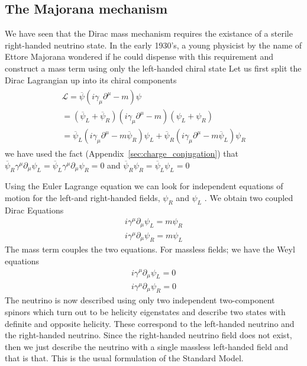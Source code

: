 \subsection{\label{sub:sm_mass_models}The Majorana mechanism}
We have seen that the Dirac mass mechanism requires the existance of a sterile right-handed neutrino state. In the early 1930’s, a young physicist by the name of Ettore Majorana wondered if he could dispense with this requirement and construct a mass term using only the left-handed chiral state
Let us first split the Dirac Lagrangian up into its chiral components
\begin{eqnarray}
    \begin{gathered}
         \mathcal{L} = \overline {\psi} (i \gamma _\mu \partial^\mu - m)\psi\\
         = (\overline {\psi}_L + \overline {\psi}_R) (i \gamma _\mu \partial^\mu - m)(\psi_L + \psi_R)\\
         = \overline {\psi}_L (i \gamma _\mu \partial^\mu - m\overline {\psi}_R)\psi_L+\overline {\psi}_R (i \gamma _\mu \partial^\mu - m\overline {\psi}_L)\psi_R
    \end{gathered}
\end{eqnarray}
we have used the fact (Appendix~\ref{sec:charge_conjugation}) that \(\overline {\psi}_R \gamma ^\mu\partial _\mu {\psi}_L = \overline {\psi}_L \gamma ^\mu\partial _\mu {\psi}_R = 0\) and \(\overline {\psi}_R {\psi}_R = \overline {\psi}_L {\psi}_L = 0\)

Using the Euler Lagrange equation we can look for independent equations of motion for the left-and right-handed fields, \(\psi _R\) and \(\psi_L\) . We obtain two coupled Dirac Equations
\begin{equation}
    \begin{gathered}
        i \gamma ^\mu \partial_\mu \psi _L = m \psi _R\\
        i \gamma ^\mu \partial_\mu \psi _R = m \psi _L
    \end{gathered}
\end{equation}
The mass term couples the two equations. For massless fields; we have the Weyl equations
\begin{equation}
    \begin{gathered}
        i \gamma ^\mu \partial_\mu \psi _L = 0\\
        i \gamma ^\mu \partial_\mu \psi _R = 0
    \end{gathered}
\end{equation}
The neutrino is now described using only two independent two-component spinors which turn out to be helicity eigenstates and describe two states with definite and opposite helicity. These correspond to the left-handed neutrino and the right-handed neutrino. Since the right-handed neutrino field does not exist, then we just describe the neutrino with a single massless left-handed field and that is that. This is the usual formulation of the Standard Model.

